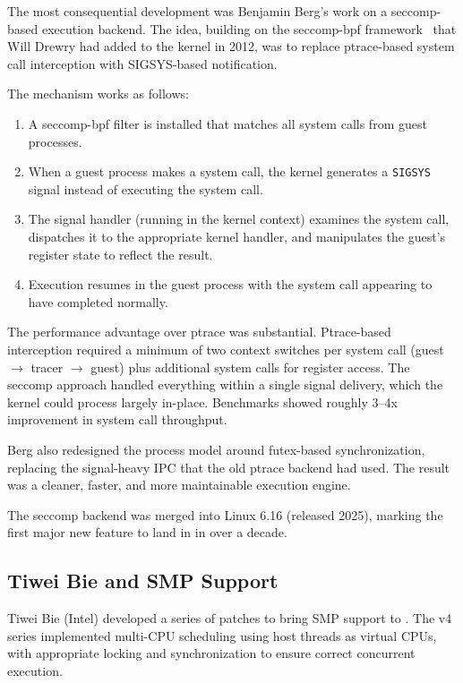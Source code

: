 The most consequential development was Benjamin Berg's work on a seccomp-based
execution backend.  The idea, building on the seccomp-bpf
framework~\cite{seccomp-bpf} that Will Drewry had added to the kernel in 2012,
was to replace ptrace-based system call interception with SIGSYS-based
notification.

The mechanism works as follows:
\begin{enumerate}[nosep]
  \item A seccomp-bpf filter is installed that matches all system calls from
    guest processes.
  \item When a guest process makes a system call, the kernel generates a
    \texttt{SIGSYS} signal instead of executing the system call.
  \item The signal handler (running in the \UML{} kernel context) examines
    the system call, dispatches it to the appropriate \UML{} kernel handler,
    and manipulates the guest's register state to reflect the result.
  \item Execution resumes in the guest process with the system call appearing
    to have completed normally.
\end{enumerate}

\noindent
The performance advantage over ptrace was substantial.  Ptrace-based
interception required a minimum of two context switches per system call
(guest $\to$ tracer $\to$ guest) plus additional system calls for register
access.  The seccomp approach handled everything within a single signal
delivery, which the kernel could process largely in-place.  Benchmarks showed
roughly 3--4x improvement in system call throughput.

Berg also redesigned the \UML{} process model around futex-based
synchronization, replacing the signal-heavy IPC that the old ptrace backend
had used.  The result was a cleaner, faster, and more maintainable execution
engine.

The seccomp backend was merged into Linux 6.16 (released 2025), marking the
first major new feature to land in  in over a decade.

\subsection{Tiwei Bie and SMP Support}
\label{sec:history-smp}

Tiwei Bie (Intel) developed a series of patches to bring SMP support to
\UML{}.  The v4 series implemented multi-CPU scheduling using host threads
as virtual CPUs, with appropriate locking and synchronization to ensure
correct concurrent execution.

